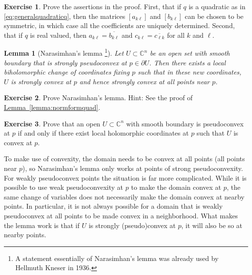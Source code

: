 \documentclass[12pt,openany]{book}
\newcommand{\C}{{\mathbb{C}}}
\theoremstyle{plain}
\newtheorem{lemma}[thm]{Lemma}
\theoremstyle{remark}
\theoremstyle{definition}
\newenvironment{exbox}{%
    \def\FrameCommand{\vrule width 1pt \relax\hspace{10pt}}%
    \MakeFramed{\advance\hsize-\width\FrameRestore}%
}{%
    \endMakeFramed
}
\theoremstyle{exercise}
\newtheorem{exercise}{Exercise}[section]
\theoremstyle{example}
\newcommand{\lemmaref}[1]{\hyperref[#1]{Lemma~\ref*{#1}}}
\begin{document}
\begin{exbox}
\begin{exercise}
Prove the assertions in the proof.  First, that if $q$ is a quadratic as in
\eqref{eq:generalquadraticq}, then the matrices
$[a_{k\ell}]$ and
$[b_{k\ell}]$ can be chosen to be symmetric, in which case
all the coefficients are uniquely determined.
Second, that if $q$ is real valued, then
 $a_{k\ell} = \overline{b_{k\ell}}$ and $c_{k\ell} = \overline{c_{\ell k}}$
for all $k$ and $\ell$.
\end{exercise}
\end{exbox}

\begin{lemma}[Narasimhan's lemma%
\footnote{A statement essentially of Narasimhan's lemma was already used by
Hellmuth
Kneser in 1936.}]
Let $U \subset \C^n$ be an open set with smooth boundary
that is strongly pseudoconvex at $p \in \partial U$.  Then there exists a local biholomorphic change of
coordinates fixing $p$ such that in these new coordinates, $U$ is strongly
convex at $p$ and hence strongly convex at all points near $p$.
\end{lemma}

\begin{exbox}
\begin{exercise}
Prove Narasimhan's lemma.  Hint: See the proof of \lemmaref{lemma:normformquad}.
\end{exercise}

\begin{exercise}
Prove that an open $U \subset \C^n$ with smooth boundary is pseudoconvex at
$p$ if and only if there exist local holomorphic coordinates at $p$ such that
$U$ is convex at $p$.
\end{exercise}
\end{exbox}

To make use of convexity, the domain needs to be convex at all points
(all points near $p$), so
Narasimhan's lemma only works at points of strong
pseudoconvexity.
For weakly pseudoconvex points the situation is far more complicated.
While it is possible to use
weak pseudoconvexity at $p$ to make the domain convex at $p$, the same
change of variables does not necessarily make the domain convex at nearby
points.  In particular, it is not always possible for a domain that is
weakly pseudoconvex at all points to be made convex in a neighborhood.
What makes the lemma work is that if
$U$ is strongly (pseudo)convex at $p$, it will also be so
at nearby points.
\end{document}
